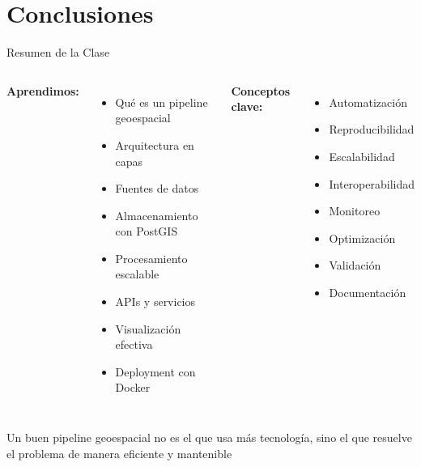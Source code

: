 \documentclass[10pt,aspectratio=169]{beamer}
\newcommand{\conceptbox}[2]{
\begin{tcolorbox}[colframe=usachblue,colback=blue!5,title=#1,fonttitle=\bfseries]
#2
\end{tcolorbox}
}
\begin{document}
\section{Conclusiones}

\begin{frame}{Resumen de la Clase}
    \begin{columns}[T]
        \textbf{Aprendimos:}
        \begin{itemize}
            \item[\faCheckCircle] Qué es un pipeline geoespacial
            \item[\faCheckCircle] Arquitectura en capas
            \item[\faCheckCircle] Fuentes de datos
            \item[\faCheckCircle] Almacenamiento con PostGIS
            \item[\faCheckCircle] Procesamiento escalable
            \item[\faCheckCircle] APIs y servicios
            \item[\faCheckCircle] Visualización efectiva
            \item[\faCheckCircle] Deployment con Docker
        \end{itemize}
        
        \textbf{Conceptos clave:}
        \begin{itemize}
            \item Automatización
            \item Reproducibilidad
            \item Escalabilidad
            \item Interoperabilidad
            \item Monitoreo
            \item Optimización
            \item Validación
            \item Documentación
        \end{itemize}
    \end{columns}
    
    \vspace{0.3cm}
    \conceptbox{Mensaje Final}{
        Un buen pipeline geoespacial no es el que usa más tecnología, sino el que resuelve el problema de manera eficiente y mantenible
    }
\end{frame}
\end{document}
